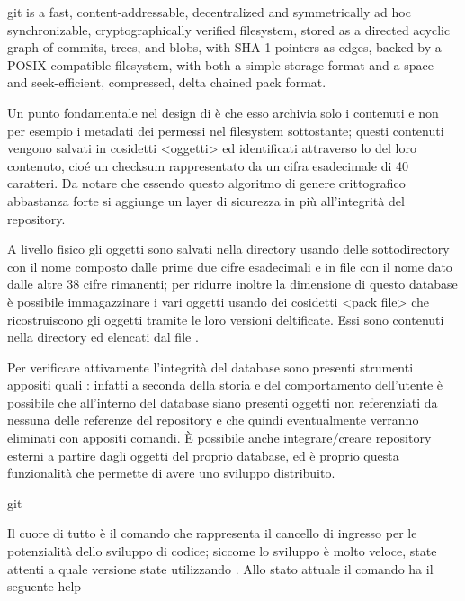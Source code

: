 \citazione git is a fast, content-addressable, decentralized and
symmetrically ad hoc synchronizable, cryptographically
 verified filesystem, stored as a directed acyclic graph of
commits, trees, and blobs, with SHA-1 pointers as edges,
 backed by a POSIX-compatible filesystem, with both a
 simple storage format and a space- and seek-efficient,
          compressed, delta chained pack format.

Un punto fondamentale nel design di \git \`e che esso archivia solo i contenuti
e non per esempio i metadati dei permessi nel filesystem sottostante; questi
contenuti vengono salvati in cosidetti \evidenzia<oggetti> ed identificati
attraverso lo  del loro contenuto, cio\'e un checksum
rappresentato da un cifra esadecimale di 40 caratteri.
Da notare che essendo questo
algoritmo di genere crittografico abbastanza forte si aggiunge un layer di
sicurezza in pi\`u all'integrità del repository.

A livello fisico gli oggetti sono salvati nella directory 
usando delle sottodirectory con il nome composto dalle prime due cifre
esadecimali e in file con il nome dato dalle altre 38 cifre rimanenti;
per ridurre inoltre la dimensione di questo database \`e
possibile immagazzinare i vari oggetti usando dei cosidetti \evidenzia<pack
file> che ricostruiscono gli oggetti tramite le loro versioni deltificate. Essi
sono contenuti nella directory  ed elencati dal file
. 

Per verificare attivamente l'integrit\`a del database sono presenti strumenti
appositi quali : infatti a seconda della storia e del
comportamento dell'utente \`e possibile che all'interno del database siano
presenti oggetti non referenziati da nessuna delle referenze del repository e
che quindi eventualmente verranno eliminati con appositi comandi. \`E possibile
anche integrare/creare repository esterni a partire dagli oggetti del proprio
database, ed \`e proprio questa funzionalit\`a che permette di avere uno
sviluppo distribuito.

\sezione git

Il cuore di tutto \`e il comando  che rappresenta il cancello di
ingresso per le potenzialit\`a dello sviluppo di codice; siccome lo sviluppo \`e
molto veloce, state attenti a quale versione state utilizzando \gitversion. Allo
stato attuale il comando ha il seguente help

